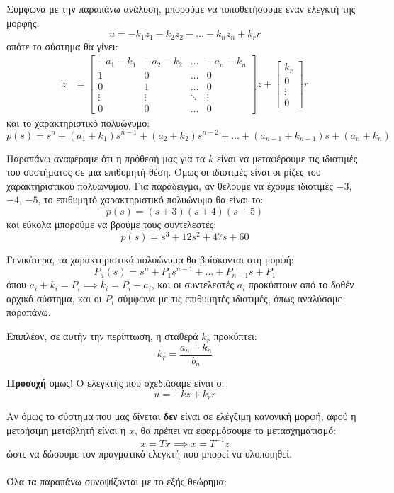 \documentclass[11pt,a4paper,notitlepage,fleqn]{article}
\begin{document}
Σύμφωνα με την παραπάνω ανάλυση, μπορούμε να τοποθετήσουμε έναν
ελεγκτή της μορφής:
\[
u = -k_1 z_1 - k_2z_2 - \dots - k_nz_n + k_r r
\]
οπότε το σύστημα θα γίνει:
\begin{align*}
\dot z &= \left[\begin{matrix}
-a_1-k_1 & -a_2-k_2 & \hdots & -a_n-k_n \\
1 & 0 & \hdots & 0\\
0 & 1 & \hdots & 0 \\
\vdots & \vdots & \ddots &\vdots \\
0 & 0 & \hdots & 0
\end{matrix}\right]z + \left[\begin{matrix}
k_r \\ 0 \\ \vdots \\ 0
\end{matrix}\right]r
\end{align*}
και το χαρακτηριστικό πολυώνυμο:
\[
p(s) = s^n + (a_1+k_1)s^{n-1} + (a_2+k_2)s^{n-2} + \dots + (a_{n-1} + k_{n-1})s + (a_n+k_n)
\]

Παραπάνω αναφέραμε ότι η πρόθεσή μας για τα \( k \) είναι να μεταφέρουμε
τις ιδιοτιμές του συστήματος σε μια επιθυμητή θέση. Όμως οι ιδιοτιμές
είναι οι ρίζες του χαρακτηριστικού πολυωνύμου. Για παράδειγμα, αν θέλουμε
να έχουμε ιδιοτιμές \( -3 \), \( -4 \), \( -5 \), το επιθυμητό χαρακτηριστικό
πολυώνυμο θα είναι το:
\[
p(s) = (s+3)(s+4)(s+5)
\]
και εύκολα μπορούμε να βρούμε τους συντελεστές:
\[
p(s) = s^3 + 12s^2 + 47s + 60
\]

Γενικότερα, τα χαρακτηριστικά πολυώνυμα θα βρίσκονται στη μορφή:
\[
P_a(s) = s^n + P_1s^{n-1} + \dots + P_{n-1}s+P_1
\]
όπου \( a_i+k_i = P_i \implies k_i = P_i - a_i \), και οι συντελεστές
\( a_i \) προκύπτουν από το δοθέν αρχικό σύστημα, και οι \( P_i \)
σύμφωνα με τις επιθυμητές ιδιοτιμές, όπως αναλύσαμε παραπάνω.

Επιπλέον, σε αυτήν την περίπτωση, η σταθερά \( k_r \) προκύπτει:
\[
k_r = \frac{a_n+k_n}{b_n}
\]

\textbf{Προσοχή} όμως! Ο ελεγκτής που σχεδιάσαμε είναι ο:
\[
u = -kz +k_r r
\]

Αν όμως το σύστημα που μας δίνεται \textbf{δεν} είναι σε ελέγξιμη κανονική μορφή, αφού η μετρήσιμη μεταβλητή είναι η \( x \), θα πρέπει να εφαρμόσουμε
το μετασχηματισμό:
\[
x = Tx \implies x = T^{-1}z
\]
ώστε να δώσουμε τον πραγματικό ελεγκτή που μπορεί να υλοποιηθεί.

\paragraph{}
Όλα τα παραπάνω συνοψίζονται με το εξής θεώρημα:
\end{document}
